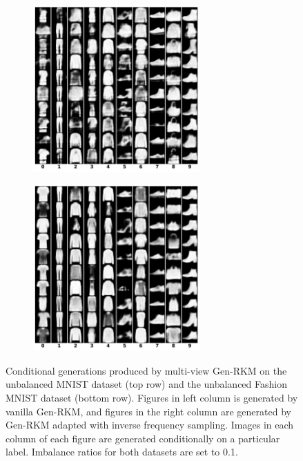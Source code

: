 \begin{figure}[ht]
\begin{subfigure}{0.45\textwidth}
        \includegraphics[width=0.7\textwidth]{Figures/Methods/RKM-congen-ubFashion.png}
    \end{subfigure}
    \hfill
    \begin{subfigure}{0.45\textwidth}
        \centering
        \includegraphics[width=0.7\textwidth]{Figures/Methods/IWRKM-congen-ubFashion.png}
    \end{subfigure}
    \caption{Conditional generations produced by multi-view Gen-RKM on the unbalanced MNIST dataset (top row) and the unbalanced Fashion MNIST dataset (bottom row). Figures in left column is generated by vanilla Gen-RKM, and figures in the right column are generated by Gen-RKM adapted with inverse frequency sampling. Images in each column of each figure are generated conditionally on a particular label. Imbalance ratios for both datasets are set to 0.1.}
    \label{fig-IWS-congen}
\end{figure}
\FloatBarrier

